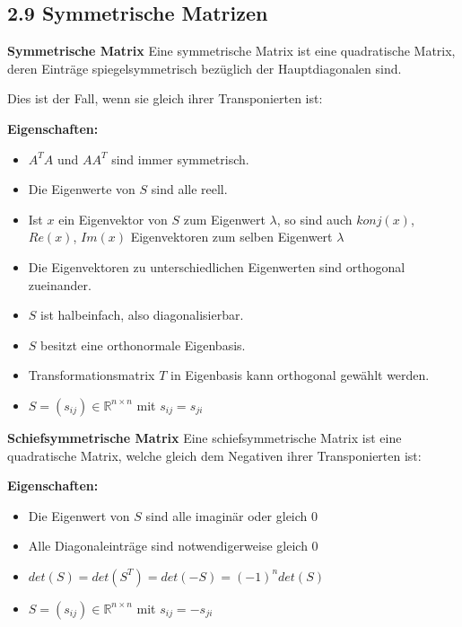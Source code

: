 \subsection{2.9 Symmetrische Matrizen}{
\vskip1pt

\textbf{Symmetrische Matrix}\vskip2pt
Eine symmetrische Matrix ist eine quadratische Matrix, deren Einträge spiegelsymmetrisch bezüglich der Hauptdiagonalen sind. \par
Dies ist der Fall, wenn sie gleich ihrer Transponierten ist:


\begin{center}
\end{center}


\textbf{Eigenschaften:}
\vspace{-3pt}

\begin{itemize}[leftmargin=0.29cm, itemsep=0.5pt]
\item $A^T A$ und $A A^T$ sind immer symmetrisch.
\item Die Eigenwerte von $S$ sind alle reell.
\item Ist $x$ ein Eigenvektor von $S$ zum Eigenwert $\lambda$, so sind auch $konj(x)$, $Re(x)$, $Im(x)$ Eigenvektoren zum selben Eigenwert $\lambda$
\item Die Eigenvektoren zu unterschiedlichen Eigenwerten sind orthogonal zueinander.
\item $S$ ist halbeinfach, also diagonalisierbar.
\item $S$ besitzt eine orthonormale Eigenbasis.
\item Transformationsmatrix $T$ in Eigenbasis kann orthogonal gewählt werden.
\item $S = (s_{ij}) \in \mathbb{R}^{n \times n}$ mit $s_{ij} = s_{ji}$
\end{itemize}\vskip4pt

\textbf{Schiefsymmetrische Matrix}\vskip2pt
Eine schiefsymmetrische Matrix ist eine quadratische Matrix, welche gleich dem Negativen ihrer Transponierten ist:


\begin{center}
\end{center}


\textbf{Eigenschaften:}
\vspace{-3pt}

\begin{itemize}[leftmargin=0.29cm, itemsep=0.5pt]
\item Die Eigenwert von $S$ sind alle imaginär oder gleich 0
\item Alle Diagonaleinträge sind notwendigerweise gleich 0
\item $det(S) = det(S^T) = det(-S) = (-1)^n det(S)$
\item $S = (s_{ij}) \in \mathbb{R}^{n \times n}$ mit $s_{ij} = -s_{ji}$
\end{itemize}
\vspace{-2mm}

}
\WhiteSpace